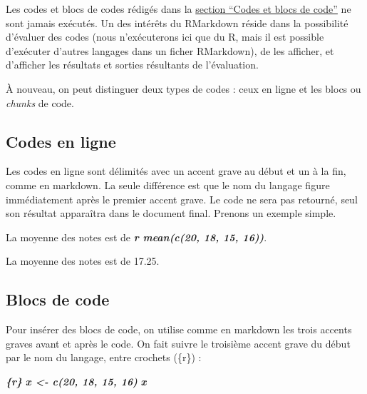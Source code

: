 \documentclass[
  11pt,
]{book}
\newenvironment{Shaded}{\begin{snugshade}}{\end{snugshade}}
\newcommand{\InformationTok}[1]{\textcolor[rgb]{0.56,0.35,0.01}{\textbf{\textit{#1}}}}
\newcommand{\NormalTok}[1]{#1}
\numberwithin{equation}{section}
\numberwithin{countremarque}{section}
\begin{document}
Les codes et blocs de codes rédigés dans la \protect\hyperlink{md-codes-blocs-codes}{section ``Codes et blocs de code''} ne sont jamais exécutés. Un des intérêts du RMarkdown réside dans la possibilité d'évaluer des codes (nous n'exécuterons ici que du R, mais il est possible d'exécuter d'autres langages dans un ficher RMarkdown), de les afficher, et d'afficher les résultats et sorties résultants de l'évaluation.

À nouveau, on peut distinguer deux types de codes : ceux en ligne et les blocs ou \emph{chunks} de code.

\hypertarget{codes-en-ligne}{%
\subsection{Codes en ligne}\label{codes-en-ligne}}

Les codes en ligne sont délimités avec un accent grave au début et un à la fin, comme en markdown. La seule différence est que le nom du langage figure immédiatement après le premier accent grave. Le code ne sera pas retourné, seul son résultat apparaîtra dans le document final. Prenons un exemple simple.

\begin{Shaded}
\begin{Highlighting}[]
\NormalTok{La moyenne des notes est de }\InformationTok{\textasciigrave{}r mean(c(20, 18, 15, 16))\textasciigrave{}}\NormalTok{.}
\end{Highlighting}
\end{Shaded}

La moyenne des notes est de 17.25.

\hypertarget{blocs-de-code}{%
\subsection{Blocs de code}\label{blocs-de-code}}

Pour insérer des blocs de code, on utilise comme en markdown les trois accents graves avant et après le code. On fait suivre le troisième accent grave du début par le nom du langage, entre crochets (\{r\}) :

\begin{Shaded}
\begin{Highlighting}[]
\InformationTok{\textasciigrave{}\textasciigrave{}\textasciigrave{}\{r\}}
\InformationTok{x \textless{}{-} c(20, 18, 15, 16)}
\InformationTok{x}
\InformationTok{\textasciigrave{}\textasciigrave{}\textasciigrave{}}
\end{Highlighting}
\end{Shaded}
\end{document}

